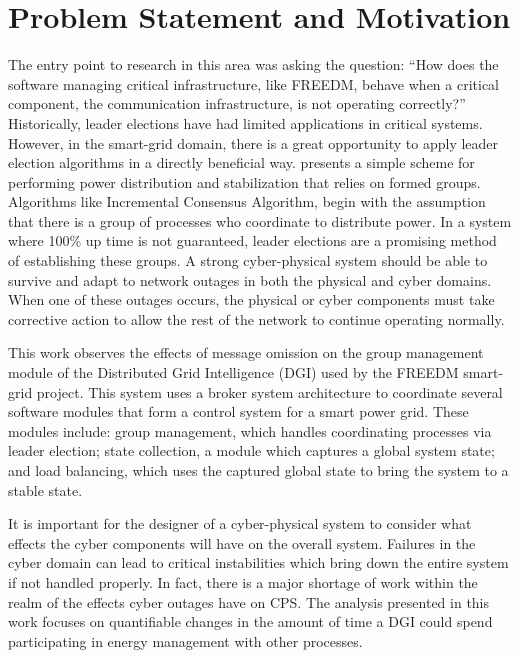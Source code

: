 \chapter{Problem Statement and Motivation}

The entry point to research in this area was asking the question: ``How does the software managing critical infrastructure, like FREEDM, behave when a critical component, the communication infrastructure, is not operating correctly?'' 
Historically, leader elections have had limited applications in critical systems. However, in the smart-grid domain, there is a great opportunity to apply leader election algorithms in a directly beneficial way. \cite{LOADBALANCING} presents a simple scheme for performing power distribution and stabilization that relies on formed groups. Algorithms like Incremental Consensus Algorithm\cite{INCREMENTALCONSENSUS}, begin with the assumption that there is a group of processes who coordinate to distribute power. In a system where 100\% up time is not guaranteed, leader elections are a promising method of establishing these groups.
A strong cyber-physical system should be able to survive and adapt to network outages in both the physical and cyber domains. When one of these outages occurs, the physical or cyber components must take corrective action to allow the rest of the network to continue operating normally.

This work observes the effects of message omission on the group management module of the Distributed Grid Intelligence (DGI) used by the FREEDM smart-grid project. This system uses a broker system architecture to coordinate several software modules that form a control system for a smart power grid. These modules include: group management, which handles coordinating processes via leader election; state collection, a module which
captures a global system state; and load balancing, which uses the captured global state to bring the system to a stable state.

It is important for the designer of a cyber-physical system to consider what effects the cyber components will have on the overall system. Failures in the cyber domain can lead to critical instabilities which bring down the entire system if not handled properly.  In fact, there is a major shortage of work within the realm of the effects cyber outages have on \ac{CPS}\cite{CYBERRESEARCHCALL}\cite{SMARTGRIDBENEFITS}.
The analysis presented in this work focuses on quantifiable changes in the amount of time a \ac{DGI} could spend participating in energy management with other processes.

